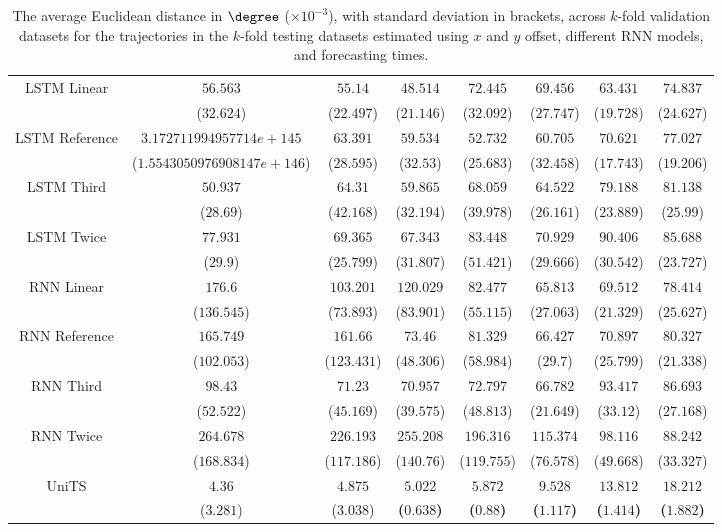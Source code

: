 \begin{table}[!ht]
{\begin{tabular}{|c|c|c|c|c|c|c|c|}
			\multirow{2}{*}{LSTM Linear} & $56.563$ & $55.14$ & $48.514$ & $72.445$ & $69.456$ & $63.431$ & $74.837$ \\
			 & ($32.624$) & ($22.497$) & ($21.146$) & ($32.092$) & ($27.747$) & ($19.728$) & ($24.627$) \\ \hline
			\multirow{2}{*}{LSTM Reference} & $3.172711994957714e+145$ & $63.391$ & $59.534$ & $52.732$ & $60.705$ & $70.621$ & $77.027$ \\
			 & ($1.5543050976908147e+146$) & ($28.595$) & ($32.53$) & ($25.683$) & ($32.458$) & ($17.743$) & ($19.206$) \\ \hline
			\multirow{2}{*}{LSTM Third} & $50.937$ & $64.31$ & $59.865$ & $68.059$ & $64.522$ & $79.188$ & $81.138$ \\
			 & ($28.69$) & ($42.168$) & ($32.194$) & ($39.978$) & ($26.161$) & ($23.889$) & ($25.99$) \\ \hline
			\multirow{2}{*}{LSTM Twice} & $77.931$ & $69.365$ & $67.343$ & $83.448$ & $70.929$ & $90.406$ & $85.688$ \\
			 & ($29.9$) & ($25.799$) & ($31.807$) & ($51.421$) & ($29.666$) & ($30.542$) & ($23.727$) \\ \hline
			\multirow{2}{*}{RNN Linear} & $176.6$ & $103.201$ & $120.029$ & $82.477$ & $65.813$ & $69.512$ & $78.414$ \\
			 & ($136.545$) & ($73.893$) & ($83.901$) & ($55.115$) & ($27.063$) & ($21.329$) & ($25.627$) \\ \hline
			\multirow{2}{*}{RNN Reference} & $165.749$ & $161.66$ & $73.46$ & $81.329$ & $66.427$ & $70.897$ & $80.327$ \\
			 & ($102.053$) & ($123.431$) & ($48.306$) & ($58.984$) & ($29.7$) & ($25.799$) & ($21.338$) \\ \hline
			\multirow{2}{*}{RNN Third} & $98.43$ & $71.23$ & $70.957$ & $72.797$ & $66.782$ & $93.417$ & $86.693$ \\
			 & ($52.522$) & ($45.169$) & ($39.575$) & ($48.813$) & ($21.649$) & ($33.12$) & ($27.168$) \\ \hline
			\multirow{2}{*}{RNN Twice} & $264.678$ & $226.193$ & $255.208$ & $196.316$ & $115.374$ & $98.116$ & $88.242$ \\
			 & ($168.834$) & ($117.186$) & ($140.76$) & ($119.755$) & ($76.578$) & ($49.668$) & ($33.327$) \\ \hline
			\multirow{2}{*}{UniTS} & $4.36$ & $4.875$ & $\mathbf{5.022}$ & $\mathbf{5.872}$ & $\mathbf{9.528}$ & $\mathbf{13.812}$ & $\mathbf{18.212}$ \\
			 & ($3.281$) & ($3.038$) & \textbf{(}$\mathbf{0.638}$\textbf{)} & \textbf{(}$\mathbf{0.88}$\textbf{)} & \textbf{(}$\mathbf{1.117}$\textbf{)} & \textbf{(}$\mathbf{1.414}$\textbf{)} & \textbf{(}$\mathbf{1.882}$\textbf{)} \\ \hline
		\end{tabular}
	}
	\caption{The average Euclidean distance in $\degree$ ($\times 10^{-3}$), with standard deviation in brackets, across $k$-fold validation datasets for the trajectories in the $k$-fold testing datasets estimated using $x$ and $y$ offset, different RNN models, and forecasting times.}
	\label{tab:all_no_abs_euclid}
\end{table}